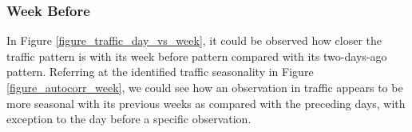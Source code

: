 \begin{table}[!t] 
\centering
    \centering
      \captionsetup{justification=centering}
    \hfill
    \caption{Transition distribution of traffic condition of (a) Pablo Ocampo and (b) Antipolo for all working days}

    \label{table_workingday_transition}
\end{table}



\subsubsection{Week Before}
In Figure \ref{figure_traffic_day_vs_week}, it could be observed how closer the traffic pattern is with its week before pattern compared with its two-days-ago pattern. Referring at the identified traffic seasonality in Figure \ref{figure_autocorr_week}, we could see how an observation in traffic appears to be more seasonal with its previous weeks as compared with the preceding days, with exception to the day before a specific observation.

